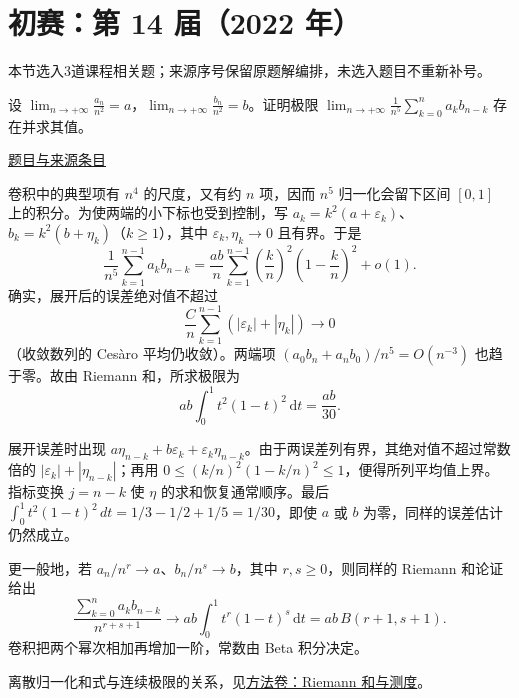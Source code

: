 \documentclass[UTF8,12pt,a4paper,fontset=fandol]{ctexart}
\begin{document}
\section{初赛：第 14 届（2022 年）}

本节选入3道课程相关题；来源序号保留原题解编排，未选入题目不重新补号。

\begin{example}[来源序号2]\label{ex:ch04-14th-A:2}\label{pr:ch04-14th-A:2}

设 $\lim_{n\rightarrow+\infty}\frac{a_{n}}{n^{2}}=a$，$\lim_{n\rightarrow+\infty}\frac{b_{n}}{n^{2}}=b$。证明极限 $\lim_{n\rightarrow+\infty}\frac{1}{n^{5}}\sum_{k=0}^{n}a_{k}b_{n-k}$ 存在并求其值。

\par\href{https://github.com/lzxcr/cmc-mathematics/blob/64916fa1fdbc3e444a652eca204d5669058ee321/src/problems/preliminary/14/02.md}{题目与来源条目}

\end{example}

\begin{solve}\label{ans:ch04-14th-A:2}

卷积中的典型项有 $n^4$ 的尺度，又有约 $n$ 项，因而 $n^5$ 归一化会留下区间 $[0,1]$ 上的积分。为使两端的小下标也受到控制，写 $a_k=k^2(a+\varepsilon_k)$、$b_k=k^2(b+\eta_k)$（$k\geq1$），其中 $\varepsilon_k,\eta_k\to0$ 且有界。于是
\[
\frac1{n^5}\sum_{k=1}^{n-1}a_kb_{n-k}
=\frac{ab}{n}\sum_{k=1}^{n-1}
 \left(\frac kn\right)^2\left(1-\frac kn\right)^2+o(1).
\]
确实，展开后的误差绝对值不超过
\[
\frac Cn\sum_{k=1}^{n-1}(|\varepsilon_k|+|\eta_k|)\longrightarrow0
\]
（收敛数列的 Cesàro 平均仍收敛）。两端项 $(a_0b_n+a_nb_0)/n^5=O(n^{-3})$ 也趋于零。故由 Riemann 和，所求极限为
\[
ab\int_0^1t^2(1-t)^2\,\mathrm dt=\frac{ab}{30}.
\]

展开误差时出现 $a\eta_{n-k}+b\varepsilon_k+\varepsilon_k\eta_{n-k}$。由于两误差列有界，其绝对值不超过常数倍的 $|\varepsilon_k|+|\eta_{n-k}|$；再用 $0\le(k/n)^2(1-k/n)^2\le1$，便得所列平均值上界。指标变换 $j=n-k$ 使 $\eta$ 的求和恢复通常顺序。最后 $\int_0^1t^2(1-t)^2\,dt=1/3-1/2+1/5=1/30$，即使 $a$ 或 $b$ 为零，同样的误差估计仍然成立。

\end{solve}

\begin{remark}[方法与条件]更一般地，若 $a_n/n^r\to a$、$b_n/n^s\to b$，其中 $r,s\geq0$，则同样的 Riemann 和论证给出
\[
\frac{\sum_{k=0}^n a_kb_{n-k}}{n^{r+s+1}}
\longrightarrow ab\int_0^1t^r(1-t)^s\,\mathrm dt
=ab\,B(r+1,s+1).
\]
卷积把两个幂次相加再增加一阶，常数由 Beta 积分决定。

离散归一化和式与连续极限的关系，见\hyperref[app:integration-riemann]{方法卷：Riemann 和与测度}。\end{remark}
\end{document}
